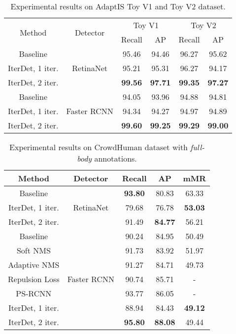 \documentclass[runningheads]{llncs}
\begin{document}
\begin{table*}[h!]
    \centering
    \begin{tabular}{c|c|cc|cc}
        \hline
        \multirow[b]{2}{*}{Method} & \multirow[b]{2}{*}{Detector} & \multicolumn{2}{c|}{Toy V1} & \multicolumn{2}{c}{Toy V2} \\ \cline{3-6}
        && Recall & AP & Recall & AP \\ \hline \hline
        Baseline & \multirow{3}{*}{RetinaNet} & 95.46 & 94.46 & 96.27 &	95.62 \\ \cline{1-1} \cline{3-6}
        IterDet, 1 iter. && 95.21 & 95.31 & 96.27 & 94.17 \\
        IterDet, 2 iter. && \textbf{99.56} & \textbf{97.71} & \textbf{99.35} & \textbf{97.27} \\ \hline \hline
        Baseline & \multirow{3}{*}{Faster RCNN} & 94.05 & 93.96 & 94.88 & 94.81 \\ \cline{1-1} \cline{3-6}
        IterDet, 1 iter. && 94.34 & 94.27 & 94.97 & 94.89 \\
        IterDet, 2 iter. && \textbf{99.60} & \textbf{99.25} & \textbf{99.29} & \textbf{99.00} \\ \hline
    \end{tabular}
    \caption{Experimental results on AdaptIS Toy V1 and Toy V2 dataset.}
    \label{tab:toy}
\end{table*}

\begin{table*}[h!]
    \centering
    \begin{tabular}{c|c|ccc}
        \hline
        Method & Detector & Recall & AP & mMR  \\ \hline \hline
        Baseline \cite{shao2018crowdhuman} & \multirow{3}{*}{RetinaNet} & \textbf{93.80} & 80.83 & 63.33 \\ \cline{1-1} \cline{3-5}
        IterDet, 1 iter. && 79.68 & 76.78 & \textbf{53.03} \\
        IterDet, 2 iter. && 91.49 & \textbf{84.77} & 56.21 \\ \hline \hline
        Baseline \cite{shao2018crowdhuman} & \multirow{7}{*}{Faster RCNN} & 90.24 & 84.95 & 50.49 \\
        Soft NMS \cite{bodla2017soft,liu2019adaptive} && 91.73 & 83.92 & 51.97 \\
        Adaptive NMS \cite{liu2019adaptive} && 91.27 & 84.71 & 49.73 \\
        Repulsion Loss \cite{wang2017repulsion,ge2020ps} && 90.74 & 85.71 & - \\
        PS-RCNN \cite{ge2020ps} && 93.77 & 86.05& - \\ \cline{1-1} \cline{3-5}
        IterDet, 1 iter. && 88.94 & 84.43 & \textbf{49.12} \\
        IterDet, 2 iter. && \textbf{95.80} & \textbf{88.08} & 49.44 \\ \hline
    \end{tabular}
    \caption{Experimental results on CrowdHuman dataset with \emph{full-body} annotations.}
    \label{tab:crowd_human_full}
\end{table*}
\end{document}
